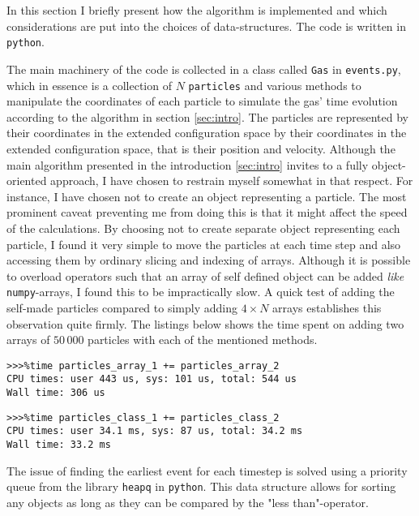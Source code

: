 In this section I briefly present how the algorithm is implemented and which considerations are put into the choices of data-structures. The code is written in \texttt{python}.


The main machinery of the code is collected in a class called \texttt{Gas} in \texttt{events.py}, which in essence is a collection of $N$ \texttt{particles} and various methods to manipulate the coordinates of each particle to simulate the gas' time evolution according to the algorithm in section \ref{sec:intro}.
The particles are represented by their coordinates in the extended configuration space by their coordinates in the extended configuration space, that is their position and velocity.
Although the main algorithm presented in the introduction \ref{sec:intro} invites to a fully object-oriented approach, I have chosen to restrain myself somewhat in that respect. 
For instance, I have chosen not to create an object representing a particle.
The most prominent caveat preventing me from doing this is that it might affect the speed of the calculations.
By choosing not to create separate object representing each particle, I found it very simple to move the particles at each time step and also accessing them by ordinary slicing and indexing of arrays. 
Although it is possible to overload operators such that an array of self defined object can be added \textit{like} \texttt{numpy}-arrays, I found this to be impractically slow. 
A quick test of adding the self-made particles compared to simply adding $4\times N$ arrays establishes this observation quite firmly. The listings below shows the time spent on adding two arrays of $50\,000$ particles with each of the mentioned methods.

\begin{lstlisting}
>>>%time particles_array_1 += particles_array_2
CPU times: user 443 us, sys: 101 us, total: 544 us
Wall time: 306 us
\end{lstlisting}

\begin{lstlisting}
>>>%time particles_class_1 += particles_class_2
CPU times: user 34.1 ms, sys: 87 us, total: 34.2 ms
Wall time: 33.2 ms
\end{lstlisting}

The issue of finding the earliest event for each timestep is solved using a priority queue from the library \texttt{heapq} in \texttt{python}. This data structure allows for sorting any objects as long as they can be compared by the "less than"-operator. 

